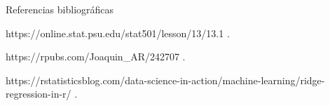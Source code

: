 \documentclass[11pt]{beamer}
\begin{document}
\begin{frame}{Referencias bibliográficas}
	\begin{thebibliography}{10}

		\beamertemplateonlinebibitems %
		https://online.stat.psu.edu/stat501/lesson/13/13.1
		.

		\beamertemplateonlinebibitems %
		https://rpubs.com/Joaquin\_AR/242707
		.

		\beamertemplateonlinebibitems %
		https://rstatisticsblog.com/data-science-in-action/machine-learning/ridge-regression-in-r/
		.


	\end{thebibliography}
\end{frame}
\end{document}
